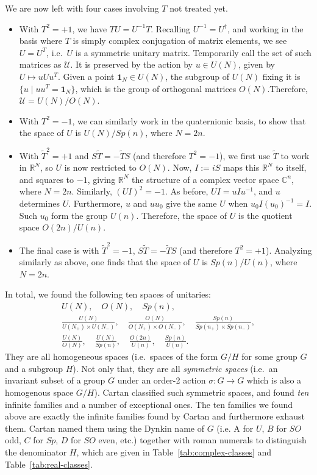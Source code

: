 \documentclass[12pt]{article}
\numberwithin{equation}{section}
\numberwithin{figure}{section}
\theoremstyle{remark}
\def\bC{\mathbb{C}}
\def\bR{\mathbb{R}}
\begin{document}
We are now left with four cases involving $T$
not treated yet.
\begin{itemize}
\item With $T^2=+1$, we have $TU=U^{-1}T$. Recalling $U^{-1}=U^\dagger$, 
and working in the basis where $T$ is simply complex conjugation of matrix elements, we see $U=U^T$, i.e.~$U$ is a symmetric unitary matrix.
Temporarily call the set of such matrices as $\mathcal{U}$.
It is preserved by the action by $u\in U(N)$, given by $U\mapsto u U u^T$.
Given a point $\mathbf{1}_N\in U(N)$, the subgroup of $U(N)$ fixing it is 
$\{u\mid uu^T=\mathbf{1}_N\}$, which is the group of orthogonal matrices $O(N)$.Therefore, $\mathcal{U}=U(N)/O(N)$.
\item With $T^2=-1$, we can similarly work in the quaternionic basis,
to show that the space of $U$ is $U(N)/Sp(n)$, where $N=2n$.
\item With $\tilde T^2=+1$ and $S\tilde T=-\tilde TS$ (and therefore $T^2=-1$),
we first use $\tilde T$ to work in $\bR^N$, so $U$ is now restricted to $O(N)$.
Now,  $I:=iS$ maps this $\bR^N$ to itself, and squares to $-1$,
giving $\bR^N$ the structure of a complex vector space $\bC^n$, where $N=2n$.
Similarly, $(UI)^2=-1$. As before, $UI=uIu^{-1}$, and $u$ determines $U$.
Furthermore, $u$ and $uu_0$ give the same $U$ when $u_0 I (u_0)^{-1}=I$.
Such $u_0$ form the group $U(n)$. Therefore, the space of $U$ is the quotient space $O(2n)/U(n)$.
\item The final case is with $\tilde T^2=-1$, $S\tilde T=-\tilde TS$ (and therefore $T^2=+1$). Analyzing similarly as above, one finds that the space of $U$ is $Sp(n)/U(n)$, where $N=2n$.
\end{itemize}

In total, we found the following ten spaces of unitaries:
\begin{equation}
  \begin{array}{c}
U(N),\quad O(N),\quad Sp(n),\\
\displaystyle
\frac{U(N)}{U(N_+)\times U(N_-)} ,\quad
\frac{O(N)}{O(N_+)\times O(N_-)} ,\quad
\frac{Sp(n)}{Sp(n_+)\times Sp(n_-)} ,\\[1em]
\displaystyle \frac{U(N)}{O(N)},\quad
\frac{U(N)}{Sp(n)},\quad
\frac{O(2n)}{U(n)},\quad
\frac{Sp(n)}{U(n)}.
\end{array}
\end{equation}
They are all homogeneous spaces (i.e.~spaces of the form $G/H$ for some group $G$ and a subgroup $H$). 
Not only that, they are all \emph{symmetric spaces} (i.e.~an invariant subset of a group $G$ under an order-2 action $\sigma:G\to G$ which is also a homogenous space $G/H$).
Cartan classified such symmetric spaces, and found \emph{ten} infinite families and a number of exceptional ones. 
The ten families we found above are exactly the infinite families found by Cartan and furthermore exhaust them.
Cartan named them using the Dynkin name of $G$ 
(i.e. A for $U$, $B$ for $SO$ odd, $C$ for $Sp$, $D$ for $SO$ even, etc.)
together with roman numerals to distinguish the denominator $H$,
which are given in Table~\ref{tab:complex-classes} and Table~\ref{tab:real-classes}.
\end{document}
